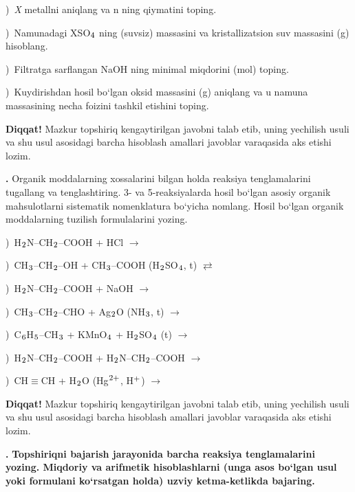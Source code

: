\documentclass[11pt,a4paper]{article}
\renewcommand{\textsubscript}[1]{\ensuremath{_{\text{\fontsize{8}{8}\selectfont #1}}}}
\renewcommand{\textsuperscript}[1]{\ensuremath{^{\text{\fontsize{8}{8}\selectfont #1}}}}
\newcommand{\qn}[1]{\textbf{\fontsize{11.5}{13}\selectfont #1}}
\newcommand{\qsep}{\par\vspace{13pt}}
\newcommand{\diqqat}[1]{\par\smallskip\noindent\textbf{Diqqat!} #1\par\medskip}
\begin{document}
)\ \textit{X} metallni aniqlang va n ning qiymatini toping.\par
{})\ Namunadagi XSO\textsubscript{4} ning (suvsiz) massasini va kristallizatsion suv massasini (g) hisoblang.\par
{})\ Filtratga sarflangan NaOH ning minimal miqdorini (mol) toping.\par
{})\ Kuydirishdan hosil bo`lgan oksid massasini (g) aniqlang va u namuna massasining necha foizini tashkil etishini toping.\par
\diqqat{Mazkur topshiriq kengaytirilgan javobni talab etib, uning yechilish usuli va shu usul asosidagi barcha hisoblash amallari javoblar varaqasida aks etishi lozim.}\qsep
\noindent\qn{42.} Organik moddalarning xossalarini bilgan holda reaksiya tenglamalarini tugallang va tenglashtiring. 3- va 5-reaksiyalarda hosil bo`lgan asosiy organik mahsulotlarni sistematik nomenklatura bo`yicha nomlang. Hosil bo`lgan organik moddalarning tuzilish formulalarini yozing.\par
{})\ H\textsubscript{2}N--CH\textsubscript{2}--COOH + HCl $\to$\par
{})\ CH\textsubscript{3}--CH\textsubscript{2}--OH + CH\textsubscript{3}--COOH (H\textsubscript{2}SO\textsubscript{4}, t) $\rightleftarrows$\par
{})\ H\textsubscript{2}N--CH\textsubscript{2}--COOH + NaOH $\to$\par
{})\ CH\textsubscript{3}--CH\textsubscript{2}--CHO + Ag\textsubscript{2}O (NH\textsubscript{3}, t) $\to$\par
{})\ C\textsubscript{6}H\textsubscript{5}--CH\textsubscript{3} + KMnO\textsubscript{4} + H\textsubscript{2}SO\textsubscript{4} (t) $\to$\par
{})\ H\textsubscript{2}N--CH\textsubscript{2}--COOH + H\textsubscript{2}N--CH\textsubscript{2}--COOH $\to$\par
{})\ CH$\equiv$CH + H\textsubscript{2}O (Hg\textsuperscript{2+}, H\textsuperscript{+}) $\to$\par
\diqqat{Mazkur topshiriq kengaytirilgan javobni talab etib, uning yechilish usuli va shu usul asosidagi barcha hisoblash amallari javoblar varaqasida aks etishi lozim.}\qsep
\noindent\qn{43.} \textbf{Topshiriqni bajarish jarayonida barcha reaksiya tenglamalarini yozing. Miqdoriy va arifmetik hisoblashlarni (unga asos bo`lgan usul yoki formulani ko`rsatgan holda) uzviy ketma-ketlikda bajaring.}\par\smallskip
\end{document}
